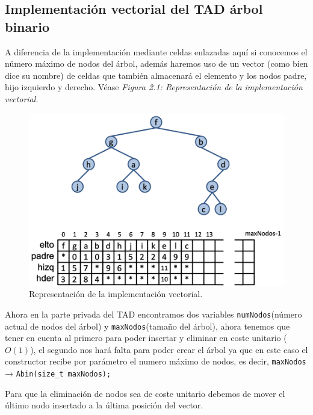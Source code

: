 \subsection{Implementación vectorial del TAD árbol binario}
A diferencia de la implementación mediante celdas enlazadas aquí si conocemos el número máximo de nodos del árbol, además haremos uso de un vector (como bien dice su nombre) de celdas que también almacenará el elemento y los nodos padre, hijo izquierdo y derecho. Véase \textit{Figura 2.1: Representación de la implementación vectorial.}

\begin{figure}[h]
  \begin{center}
    \includegraphics*[width=\textwidth]{assets/IVEC1.png}
  \end{center}
  \caption{Representación de la implementación vectorial.}
\end{figure}

Ahora en la parte privada del TAD encontramos dos variables \texttt{numNodos}(número actual de nodos del árbol) y \texttt{maxNodos}(tamaño del árbol), ahora tenemos que tener en cuenta al primero para poder insertar y eliminar en coste unitario (\(O(1)\)), el segundo nos hará falta para poder crear el árbol ya que en este caso el constructor recibe por parámetro el numero máximo de nodos, es decir, \texttt{maxNodos} → \verb|Abin(size_t maxNodos);|

Para que la eliminación de nodos sea de coste unitario debemos de mover el último nodo insertado a la última posición del vector.

